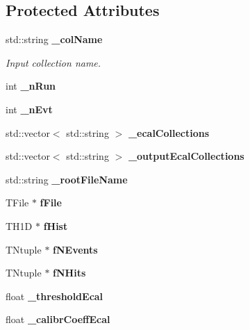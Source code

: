 \subsection*{Protected Attributes}
\begin{DoxyCompactItemize}
\item 
std\-::string {\bf \-\_\-col\-Name}\label{classScECALDigitizer_a3caef161c2472e7a6fea690ebd012f09}

\begin{DoxyCompactList}\small\item\em Input collection name. \end{DoxyCompactList}\item 
int {\bfseries \-\_\-n\-Run}\label{classScECALDigitizer_a8ddac6c05e16590e133456f5943d0cb7}

\item 
int {\bfseries \-\_\-n\-Evt}\label{classScECALDigitizer_a9a3a3d29ed875c5c574758478e22c073}

\item 
std\-::vector$<$ std\-::string $>$ {\bfseries \-\_\-ecal\-Collections}\label{classScECALDigitizer_aa50779725972af8eca079f0f387d7ada}

\item 
std\-::vector$<$ std\-::string $>$ {\bfseries \-\_\-output\-Ecal\-Collections}\label{classScECALDigitizer_a6d5c0ffec0c55841a3babfcface65562}

\item 
std\-::string {\bfseries \-\_\-root\-File\-Name}\label{classScECALDigitizer_ac8773de7d9ebb49cf5325649c61efcbd}

\item 
T\-File $\ast$ {\bfseries f\-File}\label{classScECALDigitizer_aa733d8db74513188e98a19f702edbc59}

\item 
T\-H1\-D $\ast$ {\bfseries f\-Hist}\label{classScECALDigitizer_a85dc4831515dc7e435c29e952ece8c3a}

\item 
T\-Ntuple $\ast$ {\bfseries f\-N\-Events}\label{classScECALDigitizer_a3689782b7b5a2c3fa02171dd14a54042}

\item 
T\-Ntuple $\ast$ {\bfseries f\-N\-Hits}\label{classScECALDigitizer_a1bd33e27ad6c92e30d3f4c5affa159a4}

\item 
float {\bfseries \-\_\-threshold\-Ecal}\label{classScECALDigitizer_abd2bd9a8ff79b668e2c4f058f762e0aa}

\item 
float {\bfseries \-\_\-calibr\-Coeff\-Ecal}\label{classScECALDigitizer_a1b592b3432ee22760a31f2701edec4ed}

\end{DoxyCompactItemize}


